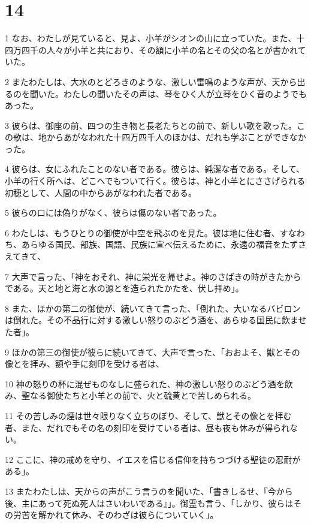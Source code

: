 \chapter{14}

\par 1 なお、わたしが見ていると、見よ、小羊がシオンの山に立っていた。また、十四万四千の人々が小羊と共におり、その額に小羊の名とその父の名とが書かれていた。
\par 2 またわたしは、大水のとどろきのような、激しい雷鳴のような声が、天から出るのを聞いた。わたしの聞いたその声は、琴をひく人が立琴をひく音のようでもあった。
\par 3 彼らは、御座の前、四つの生き物と長老たちとの前で、新しい歌を歌った。この歌は、地からあがなわれた十四万四千人のほかは、だれも学ぶことができなかった。
\par 4 彼らは、女にふれたことのない者である。彼らは、純潔な者である。そして、小羊の行く所へは、どこへでもついて行く。彼らは、神と小羊とにささげられる初穂として、人間の中からあがなわれた者である。
\par 5 彼らの口には偽りがなく、彼らは傷のない者であった。
\par 6 わたしは、もうひとりの御使が中空を飛ぶのを見た。彼は地に住む者、すなわち、あらゆる国民、部族、国語、民族に宣べ伝えるために、永遠の福音をたずさえてきて、
\par 7 大声で言った、「神をおそれ、神に栄光を帰せよ。神のさばきの時がきたからである。天と地と海と水の源とを造られたかたを、伏し拝め」。
\par 8 また、ほかの第二の御使が、続いてきて言った、「倒れた、大いなるバビロンは倒れた。その不品行に対する激しい怒りのぶどう酒を、あらゆる国民に飲ませた者」。
\par 9 ほかの第三の御使が彼らに続いてきて、大声で言った、「おおよそ、獣とその像とを拝み、額や手に刻印を受ける者は、
\par 10 神の怒りの杯に混ぜものなしに盛られた、神の激しい怒りのぶどう酒を飲み、聖なる御使たちと小羊との前で、火と硫黄とで苦しめられる。
\par 11 その苦しみの煙は世々限りなく立ちのぼり、そして、獣とその像とを拝む者、また、だれでもその名の刻印を受けている者は、昼も夜も休みが得られない。
\par 12 ここに、神の戒めを守り、イエスを信じる信仰を持ちつづける聖徒の忍耐がある」。
\par 13 またわたしは、天からの声がこう言うのを聞いた、「書きしるせ、『今から後、主にあって死ぬ死人はさいわいである』」。御霊も言う、「しかり、彼らはその労苦を解かれて休み、そのわざは彼らについていく」。
